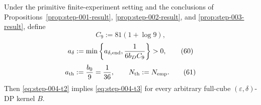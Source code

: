 \begin{proposition}
\label{prop:step-004-hardness}

Under the primitive finite-experiment setting and the conclusions of Propositions~\ref{prop:step-001-result}, \ref{prop:step-002-result}, and \ref{prop:step-003-result}, define
\[
C_9:=81(1+\log9),
\tag{59}\label{eq:step-004-59}
\]
\[
a_\delta
:=\min\left\{
a_{\delta,{\rm end}},
\frac1{6b_DC_9}
\right\}>0,
\tag{60}\label{eq:step-004-60}
\]
\[
a_{\rm th}:=\frac{b_0}{9}=\frac1{36},
\qquad
N_{\rm th}:=N_{\rm emp}.
\tag{61}\label{eq:step-004-61}
\]
Then \eqref{eq:step-004-t2} implies \eqref{eq:step-004-t3} for every arbitrary full-cube \((\varepsilon,\delta)\)-DP kernel \(B\).

\end{proposition}

